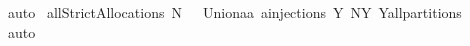 \begin{isabellebody}
%
\isadelimproof
%
\endisadelimproof
%
\isatagproof
{}\isamarkupfalse%
\ auto%
\endisatagproof
{\isafoldproof}%
%
\isadelimproof
\isanewline
%
\endisadelimproof
\isanewline
{}\isamarkupfalse%
\ {\isachardoublequoteopen}allStrictAllocations{\isacharprime}\ N\ {\isasymOmega}\ {\isacharequal}\ Union{\isacharbraceleft}{\isacharbraceleft}a{\isacharcircum}{\isacharminus}{}{\isacharbar}a{\isachardot}\ a{\isasymin}injections\ Y\ N{\isacharbraceright}{\isacharbar}Y{\isachardot}\ Y{\isasymin}all{\isacharunderscore}partitions\ {\isasymOmega}{\isacharbraceright}{\isachardoublequoteclose}%
\isadelimproof
\ %
\endisadelimproof
%
\isatagproof
{}\isamarkupfalse%
\ auto%
\endisatagproof
{\isafoldproof}%
%
\isadelimproof
%
\endisadelimproof
\isanewline
\isanewline
%
\isadelimtheory
\isanewline
%
\endisadelimtheory
%
\isatagtheory
{}\isamarkupfalse%
%
\endisatagtheory
{\isafoldtheory}%
%
\isadelimtheory
%
\endisadelimtheory
\end{isabellebody}%
